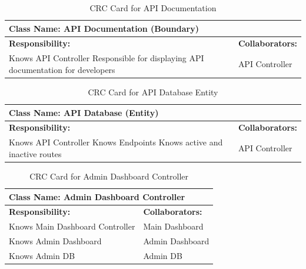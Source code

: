 \documentclass[]{article}
\begin{document}
\begin{table}[H]
    \centering
    \caption{CRC Card for API Documentation}
    \vspace{1mm}
    \begin{tabular}{|p{7.5cm}|p{7.5cm}|}
    \hline 
      \multicolumn{2}{|l|}{\textbf{Class Name: API Documentation (Boundary)}} \\
    \hline
    \textbf{Responsibility:} & \textbf{Collaborators:} \\
    \hline
        Knows API Controller \newline
        Responsible for displaying API documentation for developers \newline
        &
        API Controller \\
    \hline
    \end{tabular}
\end{table}
\begin{table}[H]
    \centering
    \caption{CRC Card for API Database Entity}
    \vspace{1mm}
    \begin{tabular}{|p{7.5cm}|p{7.5cm}|}
    \hline 
      \multicolumn{2}{|l|}{\textbf{Class Name: API Database (Entity)}} \\
    \hline
    \textbf{Responsibility:} & \textbf{Collaborators:} \\
    \hline
        Knows API Controller \newline
        Knows Endpoints \newline
        Knows active and inactive routes \newline
        &
        API Controller \\          
    \hline
    \end{tabular}
\end{table}   
\begin{table}[H]
    \centering
    \caption{CRC Card for Admin Dashboard Controller}
    \vspace{1mm}
    \begin{tabular}{|p{7.5cm}|p{7.5cm}|}
    \hline 
      \multicolumn{2}{|l|}{\textbf{Class Name: Admin Dashboard Controller}} \\
    \hline
    \textbf{Responsibility:} & \textbf{Collaborators:} \\
    \hline
        Knows Main Dashboard Controller & Main Dashboard \\
        Knows Admin Dashboard & Admin Dashboard \\
        Knows Admin DB & Admin DB \newline \\
    \hline
    \end{tabular}
\end{table}   
\end{document}

